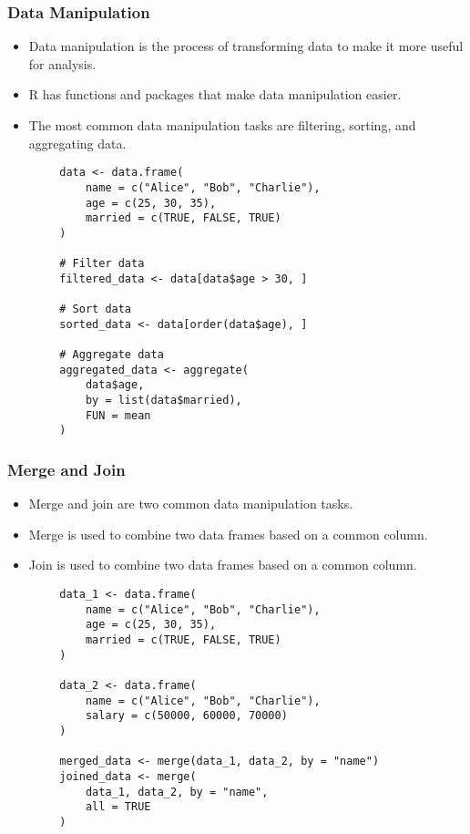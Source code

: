\documentclass[serif, 9pt, aspectratio=32]{beamer}
\begin{document}
\begin{frame}
    \centering
    \frametitle{Data Manipulation}
    \begin{itemize}
        \setlength{\itemsep}{2em}
        \item Data manipulation is the process of transforming data to make it more useful for analysis.
        \item R has functions and packages that make data manipulation easier.
        \item The most common data manipulation tasks are filtering, sorting, and aggregating data.
    \end{itemize}
\end{frame}

\begin{frame}[fragile]
    \begin{lstlisting}
        data <- data.frame(
            name = c("Alice", "Bob", "Charlie"),
            age = c(25, 30, 35),
            married = c(TRUE, FALSE, TRUE)
        )

        # Filter data
        filtered_data <- data[data$age > 30, ]

        # Sort data
        sorted_data <- data[order(data$age), ]

        # Aggregate data
        aggregated_data <- aggregate(
            data$age,
            by = list(data$married),
            FUN = mean
        )
    \end{lstlisting}
\end{frame}

\begin{frame}
    \centering
    \frametitle{Merge and Join}
    \begin{itemize}
        \setlength{\itemsep}{2em}
        \item Merge and join are two common data manipulation tasks.
        \item Merge is used to combine two data frames based on a common column.
        \item Join is used to combine two data frames based on a common column.
    \end{itemize}
\end{frame}

\begin{frame}[fragile]
    \begin{lstlisting}
        data_1 <- data.frame(
            name = c("Alice", "Bob", "Charlie"),
            age = c(25, 30, 35),
            married = c(TRUE, FALSE, TRUE)
        )

        data_2 <- data.frame(
            name = c("Alice", "Bob", "Charlie"),
            salary = c(50000, 60000, 70000)
        )

        merged_data <- merge(data_1, data_2, by = "name")
        joined_data <- merge(
            data_1, data_2, by = "name",
            all = TRUE
        )
    \end{lstlisting}
\end{frame}
\end{document}
